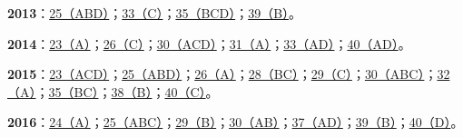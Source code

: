 \documentclass[11pt,a4paper]{article}
\begin{document}
\noindent\textbf{2013}：\hyperref[idx-2013-T1-Q25]{25（ABD）}；\hyperref[idx-2013-T3-Q33]{33（C）}；\hyperref[idx-2013-T3-Q35]{35（BCD）}；\hyperref[idx-2013-T4-Q39]{39（B）}。\par
\noindent\textbf{2014}：\hyperref[idx-2014-T1-Q23]{23（A）}；\hyperref[idx-2014-T2-Q26]{26（C）}；\hyperref[idx-2014-T2-Q30]{30（ACD）}；\hyperref[idx-2014-T3-Q31]{31（A）}；\hyperref[idx-2014-T3-Q33]{33（AD）}；\hyperref[idx-2014-T4-Q40]{40（AD）}。\par
\noindent\textbf{2015}：\hyperref[idx-2015-T1-Q23]{23（ACD）}；\hyperref[idx-2015-T1-Q25]{25（ABD）}；\hyperref[idx-2015-T2-Q26]{26（A）}；\hyperref[idx-2015-T2-Q28]{28（BC）}；\hyperref[idx-2015-T2-Q29]{29（C）}；\hyperref[idx-2015-T2-Q30]{30（ABC）}；\hyperref[idx-2015-T3-Q32]{32（A）}；\hyperref[idx-2015-T3-Q35]{35（BC）}；\hyperref[idx-2015-T4-Q38]{38（B）}；\hyperref[idx-2015-T4-Q40]{40（C）}。\par
\noindent\textbf{2016}：\hyperref[idx-2016-T1-Q24]{24（A）}；\hyperref[idx-2016-T1-Q25]{25（ABC）}；\hyperref[idx-2016-T2-Q29]{29（B）}；\hyperref[idx-2016-T2-Q30]{30（AB）}；\hyperref[idx-2016-T4-Q37]{37（AD）}；\hyperref[idx-2016-T4-Q39]{39（B）}；\hyperref[idx-2016-T4-Q40]{40（D）}。\par
{}
\end{document}
